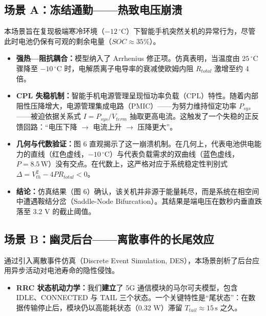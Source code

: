 \documentclass[11pt,a4paper]{ctexart}
\begin{document}
\subsection{场景 A：冻结通勤——热致电压崩溃}

本场景旨在复现极端寒冷环境（$-12\,^{\circ}\mathrm{C}$）下智能手机突然关机的异常行为，尽管此时电池仍保有可观的剩余电量（$SOC \approx 35\%$）。

\begin{itemize}[leftmargin=1.6em,itemsep=0.4em]
\item \textbf{强热—阻抗耦合：}模型纳入了 Arrhenius 修正项。仿真表明，当温度由 $25\,^{\circ}\mathrm{C}$ 骤降至 $-10\,^{\circ}\mathrm{C}$ 时，电解质离子电导率的衰减使欧姆内阻 $R_{total}$ 激增至约 4 倍。

\item \textbf{CPL 失稳机制：}智能手机电源管理呈现恒功率负载（CPL）特性。随着内部阻性压降增大，电源管理集成电路（PMIC）——为努力维持恒定功率 $P_{sys}$——被迫依据关系式 $I = P_{sys}/V_{term}$ 抽取更高电流。这触发了一个失稳的正反馈回路：“电压下降 $\rightarrow$ 电流上升 $\rightarrow$ 压降更大”。

\item \textbf{几何与代数验证：}图 6 直观揭示了这一崩溃机制。在几何上，代表电池供电能力的直线（红色虚线，$-10\,^{\circ}\mathrm{C}$）与代表负载需求的双曲线（蓝色虚线，$P = 8.5\,\mathrm{W}$）没有交点。在代数上，这严格对应于系统稳定性判别式 $\Delta = V_{th}^2 - 4 P R_{total} < 0$。
\end{itemize}

\begin{itemize}[leftmargin=1.6em,itemsep=0.4em]
\item \textbf{结论：}仿真结果（图 6）确认，该关机并非源于能量耗尽，而是系统在相空间中遭遇鞍结分岔（Saddle-Node Bifurcation）。其结果是端电压在数秒内垂直跌落至 3.2 V 的截止阈值。
\end{itemize}

\subsection{场景 B：幽灵后台——离散事件的长尾效应}

通过引入离散事件仿真（Discrete Event Simulation, DES），本场景剖析了后台应用异步活动对电池寿命的隐性侵蚀。

\begin{itemize}[leftmargin=1.6em,itemsep=0.4em]
\item \textbf{RRC 状态机动力学：}我们\textbf{建立}了 5G 通信模块的马尔可夫模型，包含 IDLE、CONNECTED 与 TAIL 三个状态。一个关键特性是“尾状态”：在数据传输停止后，模块仍以高能耗状态（0.32 W）滞留 $T_{tail} \approx 15\,\mathrm{s}$ 之久。
\end{itemize}
\end{document}
